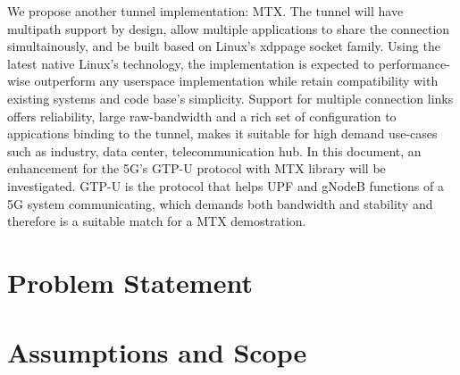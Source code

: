 We propose another tunnel implementation: \ac{MTX}. 
The tunnel will have multipath support by design, allow multiple applications to share the connection simultainously, and be built based on Linux's \ac{xdppage} socket family.
Using the latest native Linux's technology, the implementation is expected to performance-wise outperform any userspace implementation while retain compatibility with existing systems and code base's simplicity. 
Support for multiple connection links offers reliability, large raw-bandwidth and a rich set of configuration to appications binding to the tunnel, makes it suitable for high demand use-cases such as industry, data center, telecommunication hub. 
In this document, an enhancement for the 5G's GTP-U protocol with \ac{MTX} library will be investigated. GTP-U is the protocol that helps UPF and gNodeB functions of a 5G system communicating, which demands both bandwidth and stability and therefore is a suitable match for a \ac{MTX} demostration.


\section{Problem Statement}






\section{Assumptions and Scope}




